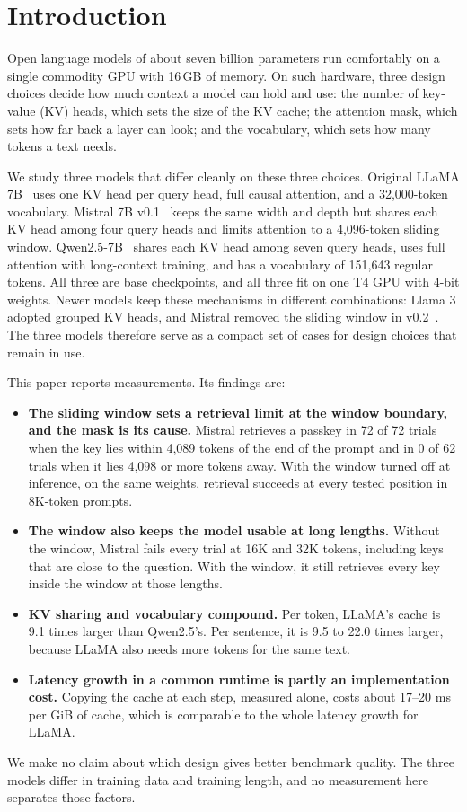 \documentclass[conference]{IEEEtran}
\begin{document}
\section{Introduction}
Open language models of about seven billion parameters run comfortably on a single commodity GPU with 16\,GB of memory. On such hardware, three design choices decide how much context a model can hold and use: the number of key-value (KV) heads, which sets the size of the KV cache; the attention mask, which sets how far back a layer can look; and the vocabulary, which sets how many tokens a text needs.

We study three models that differ cleanly on these three choices. Original LLaMA 7B~\cite{llama} uses one KV head per query head, full causal attention, and a 32,000-token vocabulary. Mistral 7B v0.1~\cite{mistral} keeps the same width and depth but shares each KV head among four query heads and limits attention to a 4,096-token sliding window. Qwen2.5-7B~\cite{qwen} shares each KV head among seven query heads, uses full attention with long-context training, and has a vocabulary of 151,643 regular tokens. All three are base checkpoints, and all three fit on one T4 GPU with 4-bit weights. Newer models keep these mechanisms in different combinations: Llama 3 adopted grouped KV heads, and Mistral removed the sliding window in v0.2~\cite{mistralv02}. The three models therefore serve as a compact set of cases for design choices that remain in use.

This paper reports measurements. Its findings are:
\begin{itemize}
\item \textbf{The sliding window sets a retrieval limit at the window boundary, and the mask is its cause.} Mistral retrieves a passkey in 72 of 72 trials when the key lies within 4,089 tokens of the end of the prompt and in 0 of 62 trials when it lies 4,098 or more tokens away. With the window turned off at inference, on the same weights, retrieval succeeds at every tested position in 8K-token prompts.
\item \textbf{The window also keeps the model usable at long lengths.} Without the window, Mistral fails every trial at 16K and 32K tokens, including keys that are close to the question. With the window, it still retrieves every key inside the window at those lengths.
\item \textbf{KV sharing and vocabulary compound.} Per token, LLaMA's cache is 9.1 times larger than Qwen2.5's. Per sentence, it is 9.5 to 22.0 times larger, because LLaMA also needs more tokens for the same text.
\item \textbf{Latency growth in a common runtime is partly an implementation cost.} Copying the cache at each step, measured alone, costs about 17--20 ms per GiB of cache, which is comparable to the whole latency growth for LLaMA.
\end{itemize}
We make no claim about which design gives better benchmark quality. The three models differ in training data and training length, and no measurement here separates those factors.
\end{document}
